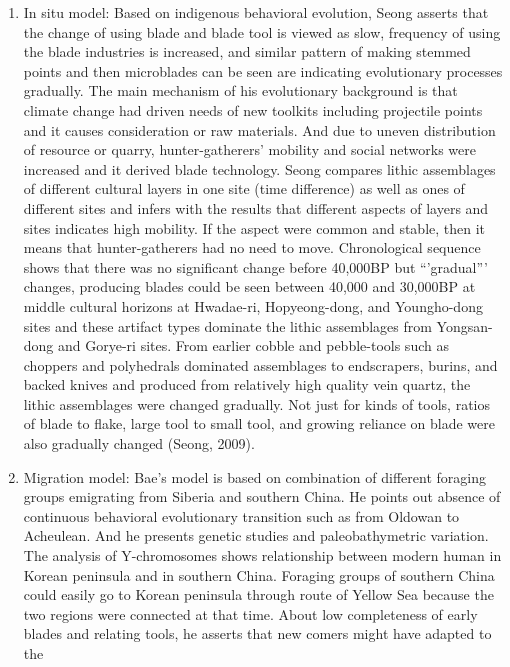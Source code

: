 \documentclass[american,man]{apa6}
\begin{document}
\begin{enumerate}
\def\labelenumi{(\arabic{enumi})}
\item
  In situ model: Based on indigenous behavioral evolution, Seong asserts
  that the change of using blade and blade tool is viewed as slow,
  frequency of using the blade industries is increased, and similar
  pattern of making stemmed points and then microblades can be seen are
  indicating evolutionary processes gradually. The main mechanism of his
  evolutionary background is that climate change had driven needs of new
  toolkits including projectile points and it causes consideration or
  raw materials. And due to uneven distribution of resource or quarry,
  hunter-gatherers' mobility and social networks were increased and it
  derived blade technology. Seong compares lithic assemblages of
  different cultural layers in one site (time difference) as well as
  ones of different sites and infers with the results that different
  aspects of layers and sites indicates high mobility. If the aspect
  were common and stable, then it means that hunter-gatherers had no
  need to move. Chronological sequence shows that there was no
  significant change before 40,000BP but \enquote{'gradual}' changes,
  producing blades could be seen between 40,000 and 30,000BP at middle
  cultural horizons at Hwadae-ri, Hopyeong-dong, and Youngho-dong sites
  and these artifact types dominate the lithic assemblages from
  Yongsan-dong and Gorye-ri sites. From earlier cobble and pebble-tools
  such as choppers and polyhedrals dominated assemblages to endscrapers,
  burins, and backed knives and produced from relatively high quality
  vein quartz, the lithic assemblages were changed gradually. Not just
  for kinds of tools, ratios of blade to flake, large tool to small
  tool, and growing reliance on blade were also gradually changed
  (Seong, 2009).
\item
  Migration model: Bae's model is based on combination of different
  foraging groups emigrating from Siberia and southern China. He points
  out absence of continuous behavioral evolutionary transition such as
  from Oldowan to Acheulean. And he presents genetic studies and
  paleobathymetric variation. The analysis of Y-chromosomes shows
  relationship between modern human in Korean peninsula and in southern
  China. Foraging groups of southern China could easily go to Korean
  peninsula through route of Yellow Sea because the two regions were
  connected at that time. About low completeness of early blades and
  relating tools, he asserts that new comers might have adapted to the

\end{enumerate}
\end{document}
